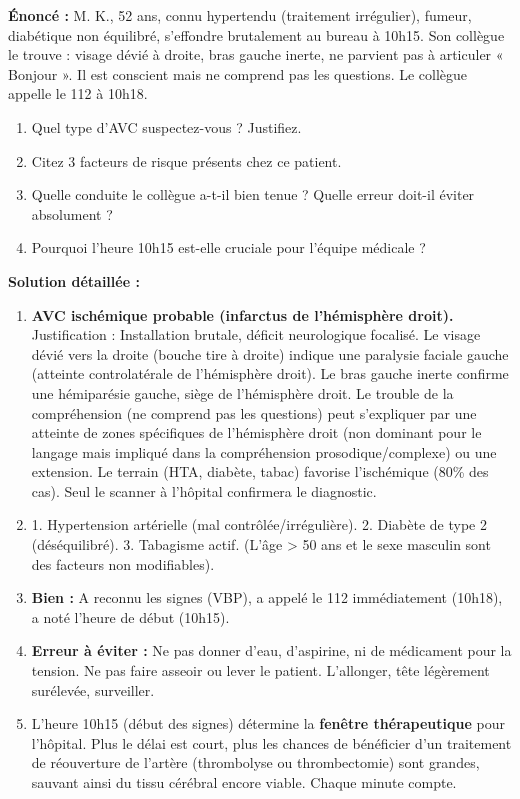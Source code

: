 \documentclass[11pt]{article}
\begin{document}
\begin{exoresolu}
\textbf{Énoncé :} M. K., 52 ans, connu hypertendu (traitement irrégulier), fumeur, diabétique non équilibré, s'effondre brutalement au bureau à 10h15. Son collègue le trouve : visage dévié à droite, bras gauche inerte, ne parvient pas à articuler « Bonjour ». Il est conscient mais ne comprend pas les questions. Le collègue appelle le 112 à 10h18.
\begin{enumerate}
    \item Quel type d'AVC suspectez-vous ? Justifiez.
    \item Citez 3 facteurs de risque présents chez ce patient.
    \item Quelle conduite le collègue a-t-il bien tenue ? Quelle erreur doit-il éviter absolument ?
    \item Pourquoi l'heure 10h15 est-elle cruciale pour l'équipe médicale ?
\end{enumerate}
\tcblower
\textbf{Solution détaillée :}
\begin{enumerate}
    \item \textbf{AVC ischémique probable (infarctus de l'hémisphère droit).} Justification : Installation brutale, déficit neurologique focalisé. Le visage dévié vers la droite (bouche tire à droite) indique une paralysie faciale gauche (atteinte controlatérale de l'hémisphère droit). Le bras gauche inerte confirme une hémiparésie gauche, siège de l'hémisphère droit. Le trouble de la compréhension (ne comprend pas les questions) peut s'expliquer par une atteinte de zones spécifiques de l'hémisphère droit (non dominant pour le langage mais impliqué dans la compréhension prosodique/complexe) ou une extension. Le terrain (HTA, diabète, tabac) favorise l'ischémique (80\% des cas). Seul le scanner à l'hôpital confirmera le diagnostic.
    \item 1. Hypertension artérielle (mal contrôlée/irrégulière). 2. Diabète de type 2 (déséquilibré). 3. Tabagisme actif. (L'âge > 50 ans et le sexe masculin sont des facteurs non modifiables).
    \item \textbf{Bien :} A reconnu les signes (VBP), a appelé le 112 immédiatement (10h18), a noté l'heure de début (10h15).
    \item \textbf{Erreur à éviter :} Ne pas donner d'eau, d'aspirine, ni de médicament pour la tension. Ne pas faire asseoir ou lever le patient. L'allonger, tête légèrement surélevée, surveiller.
    \item L'heure 10h15 (début des signes) détermine la \textbf{fenêtre thérapeutique} pour l'hôpital. Plus le délai est court, plus les chances de bénéficier d'un traitement de réouverture de l'artère (thrombolyse ou thrombectomie) sont grandes, sauvant ainsi du tissu cérébral encore viable. Chaque minute compte.
\end{enumerate}
\end{exoresolu}
\end{document}
